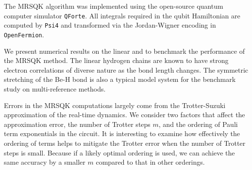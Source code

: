 \documentclass[journal=jctcce,manuscript=article]{achemso}
\newcommand{\methodabbr}[0]{MRSQK\xspace}
\begin{document}
The \methodabbr algorithm was implemented using the open-source quantum computer simulator \texttt{QForte}.\cite{Evangelista2019QForte}
All integrals required in the qubit Hamiltonian are computed by \texttt{Psi4}\cite{Parrish:2017hg} and transformed via the Jordan-Wigner encoding in \texttt{OpenFermion}.\cite{McClean:2017tj}

We present numerical results on the linear  and  to benchmark the performance of the \methodabbr method.
The linear hydrogen chains are known to have strong electron correlations of diverse nature as the bond length changes.\cite{Sinitskiy2010StrongCorrelation,  stella2011strong, Motta2017TowardsThe, Motta:2019ts} 
The symmetric stretching of the Be-H bond is also a typical model system for the benchmark study on multi-reference methods.  
 
Errors in the \methodabbr computations largely come from the Trotter-Suzuki approximation of the real-time dynamics. 
We consider two factors that affect the approximation error, the number of Trotter steps $m$, and the ordering of Pauli term exponentials in the circuit. 
It is interesting to examine how effectively the ordering of terms helps to mitigate the Trotter error when the number of Trotter steps is small. Because if a likely optimal ordering is used, we can achieve the same accuracy by a smaller $m$ compared to that in other orderings.
\end{document}
